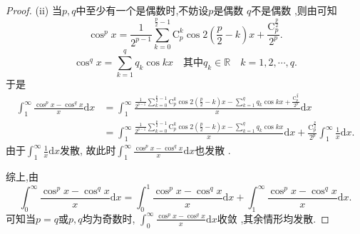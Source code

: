 \documentclass[../../main.tex]{subfiles}%
\begin{document}
\begin{proof}
(ii) 当$p,q$中至少有一个是偶数时,不妨设$p$是偶数 $q$不是偶数 ,则由可知  
\[
\cos ^px=\frac{1}{2^{p-1}}\sum_{k=0}^{\frac{p}{2}-1}{\mathrm{C}_{p}^{k}\cos 2\left( \frac{p}{2}-k \right) x}+\frac{\mathrm{C}_{p}^{\frac{p}{2}}}{2^p}.
\]  
\[
\cos ^qx=\sum_{k=1}^q{q_k\cos kx} \quad \text{其中}q_k\in \mathbb{R} \quad k=1,2,\cdots,q.
\] 
于是
\begin{align*}
\int_1^{\infty}{\frac{\cos ^px-\cos ^qx}{x}\mathrm{d}x}&=\int_1^{\infty}{\frac{\frac{1}{2^{p-1}}\sum\limits_{k=0}^{\frac{p}{2}-1}{\mathrm{C}_{p}^{k}\cos 2\left( \frac{p}{2}-k \right) x}-\sum\limits_{k=1}^q{q_k\cos kx}+\frac{\mathrm{C}_{p}^{\frac{p}{2}}}{2^p}}{x}\mathrm{d}x}\\
&=\int_1^{\infty}{\frac{\frac{1}{2^{p-1}}\sum\limits_{k=0}^{\frac{p}{2}-1}{\mathrm{C}_{p}^{k}\cos 2\left( \frac{p}{2}-k \right) x}-\sum\limits_{k=1}^q{q_k\cos kx}}{x}\mathrm{d}x}+\frac{\mathrm{C}_{p}^{\frac{p}{2}}}{2^p}\int_1^{\infty}{\frac{1}{x}\mathrm{d}x}.
\end{align*}  
由于$\int_1^{\infty}{\frac{1}{x}\mathrm{d}x}$发散, 故此时$\int_1^{\infty}{\frac{\cos ^px-\cos ^qx}{x}\mathrm{d}x}$也发散  .

综上,由  
\[
\int_0^{\infty}{\frac{\cos ^px-\cos ^qx}{x}\mathrm{d}x}=\int_0^1{\frac{\cos ^px-\cos ^qx}{x}\mathrm{d}x}+\int_1^{\infty}{\frac{\cos ^px-\cos ^qx}{x}\mathrm{d}x}.
\]
可知当$p=q$或$p,q$均为奇数时, $\int_0^{\infty}{\frac{\cos ^px-\cos ^qx}{x}\mathrm{d}x}$收敛 ,其余情形均发散.

\end{proof}
\end{document}
